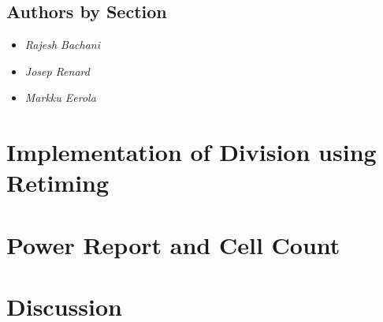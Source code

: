 \documentclass[11pt,a4paper]{article}
\begin{document}
\subsection{Authors by Section}
\begin{itemize}
\item \textit{Rajesh Bachani} 
\item \textit{Josep Renard} 
\item \textit{Markku Eerola} 
\end{itemize}

\section{Implementation of Division using Retiming}
\label{section:impl}
\section{Power Report and Cell Count}
\label{section:power}
\section{Discussion}
\label{section:discussion}
\end{document}
